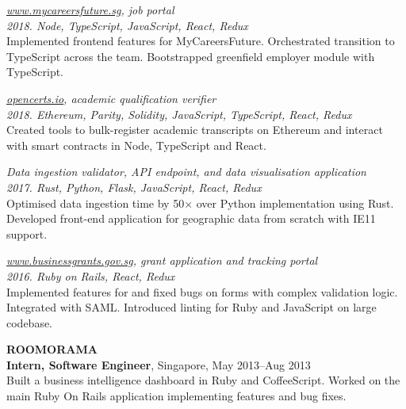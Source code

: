\documentclass[line, margin]{res}
\begin{document}
\begin{resume}
        \textit{\href{https://www.mycareersfuture.sg}{www.mycareersfuture.sg}, job portal} \\
        \textit{2018. Node, TypeScript, JavaScript, React, Redux} \\
        Implemented frontend features for MyCareersFuture. Orchestrated transition to TypeScript across the team. Bootstrapped greenfield employer module with TypeScript.

        \textit{\href{https://opencerts.io/}{opencerts.io}, academic qualification verifier} \\
        \textit{2018. Ethereum, Parity, Solidity, JavaScript, TypeScript, React, Redux} \\
        Created tools to bulk-register academic transcripts on Ethereum and interact with smart contracts in Node, TypeScript and React.

        \textit{Data ingestion validator, API endpoint, and data visualisation application} \\
        \textit{2017. Rust, Python, Flask, JavaScript, React, Redux} \\
        Optimised data ingestion time by 50$\times$ over Python implementation using Rust.
        Developed front-end application for geographic data from scratch with IE11 support.

        \textit{\href{https://www.businessgrants.gov.sg/}{www.businessgrants.gov.sg}, grant application and tracking portal} \\
        \textit{2016. Ruby on Rails, React, Redux} \\
        Implemented features for and fixed bugs on forms with complex validation logic.
        Integrated with SAML.
        Introduced linting for Ruby and JavaScript on large codebase.

        \pagebreak

        \textbf{ROOMORAMA} \\
        \textbf{Intern, Software Engineer}, Singapore, May 2013--Aug 2013 \\
        Built a business intelligence dashboard in Ruby and CoffeeScript. Worked on the main Ruby On Rails application implementing features and bug fixes.



\end{resume}
\end{document}
